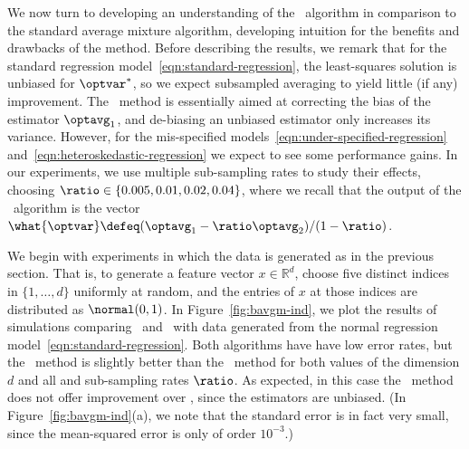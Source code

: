 \documentclass[11pt,twoside]{article}
\theoremstyle{definition}
\newcommand{\real}{\mathbb{R}}
\begin{document}
We now turn to developing an understanding of the \savgm\ algorithm in
comparison to the standard average mixture algorithm, developing
intuition for the benefits and drawbacks of the method.  Before
describing the results, we remark that for the standard regression
model~\eqref{eqn:standard-regression}, the least-squares solution is
unbiased for $\optvar^*$, so we expect subsampled averaging to yield
little (if any) improvement. The \savgm\ method is essentially aimed
at correcting the bias of the estimator $\optavg_1$, and de-biasing an
unbiased estimator only increases its variance. However, for the
mis-specified models~\eqref{eqn:under-specified-regression}
and~\eqref{eqn:heteroskedastic-regression} we expect to see some
performance gains. In our experiments, we use multiple sub-sampling
rates to study their effects, choosing
$\ratio\in\{0.005,0.01,0.02,0.04\}$, where we recall that the output
of the \savgm\ algorithm is the vector \mbox{$\what{\optvar} \defeq
  (\optavg_1 - \ratio\optavg_2) / (1 - \ratio)$.}

We begin with experiments in which the data is generated as in the
previous section. That is, to generate a feature vector $x \in
\real^d$, choose five distinct indices in $\{1, \ldots, d\}$ uniformly
at random, and the entries of $x$ at those indices are distributed as
$\normal(0, 1)$.  In Figure~\ref{fig:bavgm-ind}, we plot the results
of simulations comparing \avgm\ and \savgm\ with data generated from
the normal regression model~\eqref{eqn:standard-regression}. Both
algorithms have have low error rates, but the \avgm\ method is
slightly better than the \savgm\ method for both values of the
dimension $d$ and all and sub-sampling rates $\ratio$.  As expected,
in this case the \savgm\ method does not offer improvement over \avgm,
since the estimators are unbiased. (In Figure~\ref{fig:bavgm-ind}(a),
we note that the standard error is in fact very small, since the
mean-squared error is only of order $10^{-3}$.)
\end{document}
